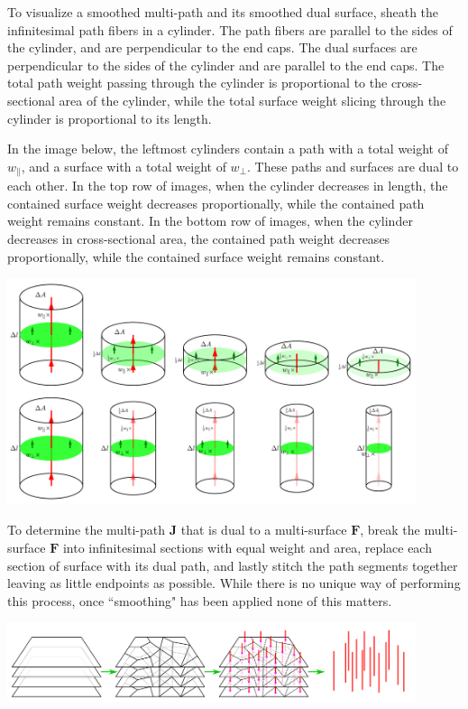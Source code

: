 \documentclass{book}
\begin{document}
To visualize a smoothed multi-path and its smoothed dual surface, sheath the infinitesimal path fibers in a cylinder. The path fibers are parallel to the sides of the cylinder, and are perpendicular to the end caps. The dual surfaces are perpendicular to the sides of the cylinder and are parallel to the end caps. The total path weight passing through the cylinder is proportional to the cross-sectional area of the cylinder, while the total surface weight slicing through the cylinder is proportional to its length.

In the image below, the leftmost cylinders contain a path with a total weight of \(w_{\parallel}\), and a surface with a total weight of \(w_{\perp}\). These paths and surfaces are dual to each other. In the top row of images, when the cylinder decreases in length, the contained surface weight decreases proportionally, while the contained path weight remains constant. In the bottom row of images, when the cylinder decreases in cross-sectional area, the contained path weight decreases proportionally, while the contained surface weight remains constant. 

\begin{center}
\includegraphics[width = 0.9\textwidth]{Duality/path_surface_duality_2}
\end{center}

To determine the multi-path \(\mathbf{J}\) that is dual to a multi-surface \(\mathbf{F}\), break the multi-surface \(\mathbf{F}\) into infinitesimal sections with equal weight and area, replace each section of surface with its dual path, and lastly stitch the path segments together leaving as little endpoints as possible. While there is no unique way of performing this process, once ``smoothing" has been applied none of this matters.  

\begin{center}
\includegraphics[width = 0.9\textwidth]{Duality/path_surface_duality_3}
\end{center}
\end{document}
